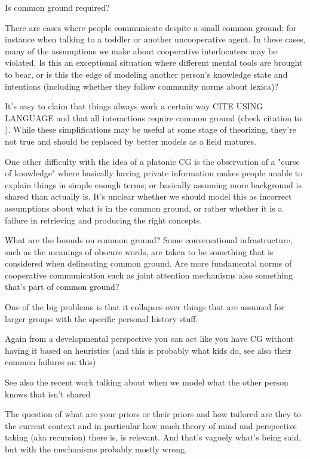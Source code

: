 \documentclass[]{article}
\begin{document}
Is common ground required? 

There are cases where people communicate despite a small common ground; for instance when talking to a toddler or another uncooperative agent. In these cases, many of the assumptions we make about cooperative interlocuters may be violated. Is this an exceptional situation where different mental tools are brought to bear, or is this the edge of modeling another person's knowledge state and intentions (including whether they follow community norms about lexica)? 


It's easy to claim that things always work a certain way CITE USING LANGUAGE and that all interactions require common ground (check citation to \cite{clark1996}). While these simplifications may be useful at some stage of theorizing, they're not true and should be replaced by better models as a field matures. 


One other difficulty with the idea of a platonic CG is the observation of a "curse of knowledge" where basically having private information makes people unable to explain things in simple enough terms; or basically assuming more background is shared than actually is. It's unclear whether we should model this as incorrect assumptions about what is in the common ground, or rather whether it is a failure in retrieving and producing the right concepts. 

What are the bounds on common ground? Some conversational infrastructure, such as the meanings of obscure words, are taken to be something that is considered when delineating common ground. Are more fundamental norms of cooperative communication such as joint attention mechanisms also something that's part of common ground? 

One of the big problems is that it collapses over things that are assumed for larger groups with the specific personal history stuff. 



Again from a developmental perspective you can act like you have CG without having it based on heuristics (and this is probably what kids do, see also their common failures on this) 

See also the recent work talking about when we model what the other person knows that isn't shared 

The question of what are your priors or their priors and how tailored are they to the current context and in particular how much theory of mind and perspective taking (aka recursion) there is, is relevant. And that's vaguely what's being said, but with the mechanisms probably mostly wrong. 
\end{document}
